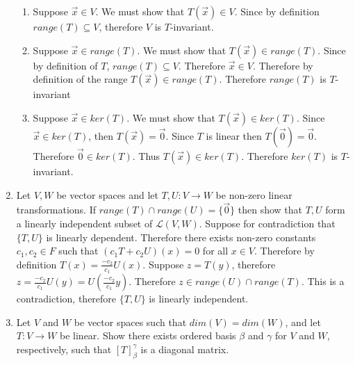 \documentclass[12pt, letterpaper]{article}
\begin{document}
\begin{enumerate}
\begin{enumerate}
			\item Suppose $\Vec{x} \in V$.  We must show that $T(\Vec{x}) \in V$.  Since by definition $range(T) \subseteq V$, therefore $V$ is $T$-invariant.  
			\item Suppose $\Vec{x} \in range(T)$.  We must show that $T(\Vec{x}) \in range(T).$  Since by definition of $T$, $range(T) \subseteq V$.  Therefore $\Vec{x} \in V$.  Therefore by definition of the range $T(\Vec{x}) \in range(T)$.  Therefore $range(T)$ is $T$-invariant
			\item Suppose $\Vec{x} \in ker(T)$.  We must show that $T(\Vec{x}) \in ker(T)$.  Since $\Vec{x} \in ker(T)$, then $T(\Vec{x}) = \Vec{0}$.  Since $T$ is linear then $T(\Vec{0}) = \Vec{0}$.  Therefore $\Vec{0} \in ker(T)$.  Thus $T(\Vec{x}) \in ker(T)$.  Therefore $ker(T)$ is $T$-invariant.  
		\end{enumerate}
		\newpage
		\item Let $V,W$ be vector spaces and let $T,U: V\to W$ be non-zero linear transformations.  If $range(T) \cap range(U) = \{\Vec{0}\}$ then show that $T,U$ form a linearly independent subset of $\mathcal{L}(V,W)$.
		Suppose for contradiction that $\{T,U\}$ is linearly dependent.  Therefore there exists non-zero constants $c_1,c_2 \in F$ such that $(c_1 T + c_2 U)(x) = 0$ for all $x \in V$. Therefore by definition $T(x) = \frac{-c_2}{c_1} U(x)$.  Suppose $z = T(y)$, therefore $z = \frac{-c_2}{c_1} U(y) = U(\frac{-c_2}{c_1} y)$.  Therefore $z \in range(U) \cap range(T)$.  This is a contradiction, therefore $\{T,U\}$ is linearly independent.  
		\newpage
		\item Let $V$ and $W$ be vector spaces such that $dim(V) = dim(W)$, and let $T: V \to W$ be linear.  Show there exists ordered basis $\beta$ and $\gamma$ for $V$ and $W$, respectively, such that $[T]_\beta^\gamma$ is a diagonal matrix.
		

\end{enumerate}
\end{document}
